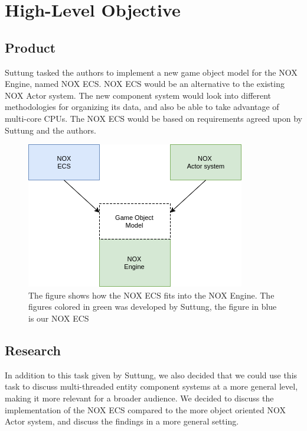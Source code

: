 \section{High-Level Objective}
\subsection{Product}
Suttung tasked the authors to implement a new game object model for the NOX Engine, named NOX ECS.
NOX ECS would be an alternative to the existing NOX Actor system.
The new component system would look into different methodologies for organizing its data, and also
be able to take advantage of multi-core CPUs.
The NOX ECS would be based on requirements agreed upon by Suttung and the authors.

\begin{figure}[H]
    \begin{center}
    \includegraphics[scale=0.45]{images/ecs_vs_actor_distinction.png}
    \caption[NOX ECS versus NOX Actor]{The figure shows how the NOX ECS fits into the NOX Engine. The figures colored in green was developed by Suttung, the figure in blue is our NOX ECS}
    \label{fig:ecs_vs_actor_distinction}
    \end{center}
\end{figure}

\subsection{Research}
In addition to this task given by Suttung, we also decided that we could use this task to discuss
multi-threaded entity component systems at a more general level, making it more relevant for a broader audience.
We decided to discuss the implementation of the NOX ECS compared to the more object oriented NOX Actor system,
and discuss the findings in a more general setting.
